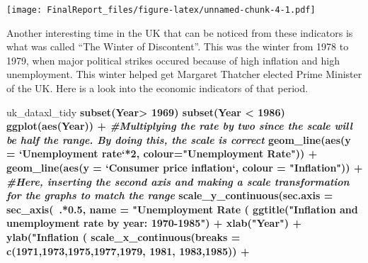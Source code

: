 \documentclass[]{article}
\newenvironment{Shaded}{\begin{snugshade}}{\end{snugshade}}
\newcommand{\KeywordTok}[1]{\textcolor[rgb]{0.13,0.29,0.53}{\textbf{#1}}}
\newcommand{\DataTypeTok}[1]{\textcolor[rgb]{0.13,0.29,0.53}{#1}}
\newcommand{\DecValTok}[1]{\textcolor[rgb]{0.00,0.00,0.81}{#1}}
\newcommand{\FloatTok}[1]{\textcolor[rgb]{0.00,0.00,0.81}{#1}}
\newcommand{\StringTok}[1]{\textcolor[rgb]{0.31,0.60,0.02}{#1}}
\newcommand{\CommentTok}[1]{\textcolor[rgb]{0.56,0.35,0.01}{\textit{#1}}}
\newcommand{\OperatorTok}[1]{\textcolor[rgb]{0.81,0.36,0.00}{\textbf{#1}}}
\newcommand{\NormalTok}[1]{#1}
\begin{document}
\texttt{[image: FinalReport\_files/figure-latex/unnamed-chunk-4-1.pdf]}

Another interesting time in the UK that can be noticed from these
indicators is what was called ``The Winter of Discontent''. This was the
winter from 1978 to 1979, when major political strikes occured because
of high inflation and high unemployment. This winter helped get Margaret
Thatcher elected Prime Minister of the UK. Here is a look into the
economic indicators of that period.

\begin{Shaded}
\begin{Highlighting}[]
\NormalTok{uk_dataxl_tidy }\OperatorTok{%>%}
\StringTok{  }\KeywordTok{subset}\NormalTok{(Year}\OperatorTok{>}\StringTok{ }\DecValTok{1969}\NormalTok{) }\OperatorTok{%>%}
\StringTok{   }\KeywordTok{subset}\NormalTok{(Year }\OperatorTok{<}\StringTok{ }\DecValTok{1986}\NormalTok{) }\OperatorTok{%>%}
\StringTok{  }\KeywordTok{ggplot}\NormalTok{(}\KeywordTok{aes}\NormalTok{(Year)) }\OperatorTok{+}
\StringTok{  }\CommentTok{#Multiplying the rate by two since the scale will be half the range. By doing this, the scale is correct}
\StringTok{  }\KeywordTok{geom_line}\NormalTok{(}\KeywordTok{aes}\NormalTok{(}\DataTypeTok{y =} \StringTok{`}\DataTypeTok{Unemployment rate}\StringTok{`}\OperatorTok{*}\DecValTok{2}\NormalTok{, }\DataTypeTok{colour=}\StringTok{"Unemployment Rate"}\NormalTok{)) }\OperatorTok{+}
\StringTok{  }\KeywordTok{geom_line}\NormalTok{(}\KeywordTok{aes}\NormalTok{(}\DataTypeTok{y =} \StringTok{`}\DataTypeTok{Consumer price inflation}\StringTok{`}\NormalTok{, }\DataTypeTok{colour =} \StringTok{"Inflation"}\NormalTok{)) }\OperatorTok{+}
\StringTok{  }\CommentTok{#Here, inserting the second axis and making a scale transformation for the graphs to match the range}
\StringTok{  }\KeywordTok{scale_y_continuous}\NormalTok{(}\DataTypeTok{sec.axis =} \KeywordTok{sec_axis}\NormalTok{(}\OperatorTok{~}\NormalTok{.}\OperatorTok{*}\FloatTok{0.5}\NormalTok{, }\DataTypeTok{name =} \StringTok{"Unemployment Rate (%)"}\NormalTok{)) }\OperatorTok{+}
\StringTok{  }\KeywordTok{ggtitle}\NormalTok{(}\StringTok{"Inflation and unemployment rate by year: 1970-1985"}\NormalTok{) }\OperatorTok{+}\StringTok{ }
\StringTok{  }\KeywordTok{xlab}\NormalTok{(}\StringTok{"Year"}\NormalTok{) }\OperatorTok{+}\StringTok{ }\KeywordTok{ylab}\NormalTok{(}\StringTok{"Inflation (%)"}\NormalTok{) }\OperatorTok{+}
\StringTok{  }\KeywordTok{scale_x_continuous}\NormalTok{(}\DataTypeTok{breaks =} \KeywordTok{c}\NormalTok{(}\DecValTok{1971}\NormalTok{,}\DecValTok{1973}\NormalTok{,}\DecValTok{1975}\NormalTok{,}\DecValTok{1977}\NormalTok{,}\DecValTok{1979}\NormalTok{, }\DecValTok{1981}\NormalTok{, }\DecValTok{1983}\NormalTok{,}\DecValTok{1985}\NormalTok{)) }\OperatorTok{+}
}}}}}
\end{Highlighting}
\end{Shaded}
\end{document}
